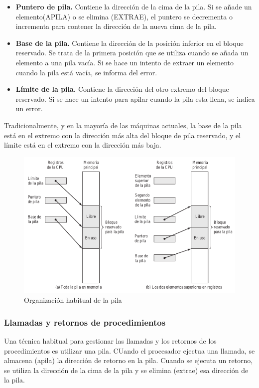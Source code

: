 \documentclass{article}
\begin{document}
							\begin{itemize}
								\item \textbf{Puntero de pila.} Contiene la dirección de la cima de la pila. Si se añade un elemento(APILA) o se elimina (EXTRAE), el puntero se decrementa o incrementa para contener la dirección de la nueva cima de la pila.
								\item \textbf{Base de la pila.} Contiene la dirección de la posición inferior en el bloque reservado. Se trata de la primera posición que se utiliza cuando se añada un elemento a una pila vacía. Si se hace un intento de extraer un elemento cuando la pila está vacía, se informa del error.
								\item \textbf{Límite de la pila.} Contiene la dirección del otro extremo del bloque reservado. Si se hace un intento para apilar cuando la pila esta llena, se indica un error.
								
							\end{itemize}
							
							Tradicionalmente, y en la mayoría de las máquinas actuales, la base de la pila está en el extremo con la dirección más alta del bloque de pila reservado, y el límite está en el extremo con la dirección más baja.
							
							\begin{figure}
							\caption{Organización habitual de la pila}
							\label{figura12:pila}
							\centering
							\includegraphics[width=1\textwidth, scale=1]{figura12.png}
							\end{figure}
							
						\subsubsection{Llamadas y retornos de procedimientos}
							Una técnica habitual para gestionar las llamadas y los retornos de los procedimientos es utilizar una pila. CUando el procesador ejectua una llamada, se almacena (apila) la dirección de retorno en la pila. Cuando se ejecuta un retorno, se utiliza la dirección de la cima de la pila y se elimina (extrae) esa dirección de la pila. \\
							
\end{document}
